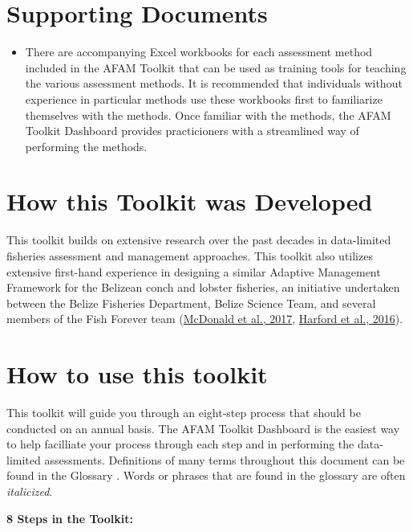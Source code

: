 \documentclass[]{book}
\providecommand{\tightlist}{%
  \setlength{\itemsep}{0pt}\setlength{\parskip}{0pt}}
\begin{document}
\section{Supporting Documents}\label{supporting-documents}

\begin{itemize}
\tightlist
\item
  There are accompanying Excel workbooks for each assessment method
  included in the AFAM Toolkit that can be used as training tools for
  teaching the various assessment methods. It is recommended that
  individuals without experience in particular methods use these
  workbooks first to familiarize themselves with the methods. Once
  familiar with the methods, the AFAM Toolkit Dashboard provides
  practicioners with a streamlined way of performing the methods.
\end{itemize}

\section{How this Toolkit was
Developed}\label{how-this-toolkit-was-developed}

This toolkit builds on extensive research over the past decades in
data-limited fisheries assessment and management approaches. This
toolkit also utilizes extensive first-hand experience in designing a
similar Adaptive Management Framework for the Belizean conch and lobster
fisheries, an initiative undertaken between the Belize Fisheries
Department, Belize Science Team, and several members of the Fish Forever
team (\href{http://dx.doi.org/10.1016/j.marpol.2016.11.027}{McDonald et
al., 2017}, \href{http://dx.doi.org/10.5343/bms.2016.1025}{Harford et
al., 2016}).

\section{How to use this toolkit}\label{how-to-use-this-toolkit}

This toolkit will guide you through an eight-step process that should be
conducted on an annual basis. The AFAM Toolkit Dashboard is the easiest
way to help facilliate your process through each step and in performing
the data-limited assessments. Definitions of many terms throughout this
document can be found in the Glossary . Words or phrases that are found
in the glossary are often \emph{italicized}.

\textbf{8 Steps in the Toolkit:}
\end{document}
